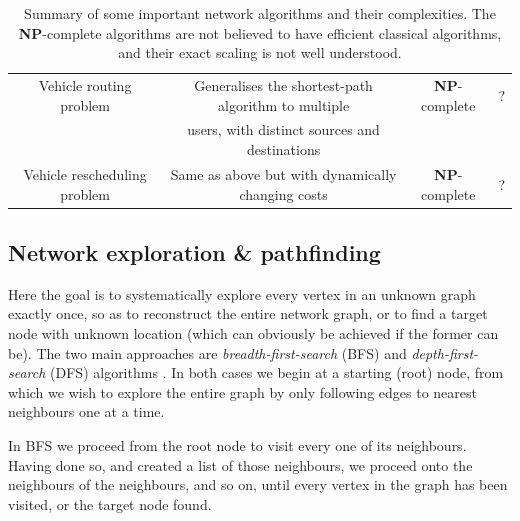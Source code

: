 \begin{table}[!htbp]
\begin{tabular}{|c|c|c|c|}
  		\hline
  		\rowcolor{Lavender} Vehicle routing problem & Generalises the shortest-path algorithm to multiple & \textbf{NP}-complete & ? \\
  		\rowcolor{Lavender} & users, with distinct sources and destinations & & \\ 
  		\hline
  		\rowcolor{Lavender} Vehicle rescheduling problem & Same as above but with dynamically changing costs & \textbf{NP}-complete & ? \\
    	\hline
	\end{tabular}
	\captionspace \caption{Summary of some important network algorithms and their complexities. The \textbf{NP}-complete algorithms are not believed to have efficient classical algorithms, and their exact scaling is not well understood.} \label{tab:net_alg_sum} 
\end{table}
\startalgtable

%
%

\subsection{Network exploration \& pathfinding} \label{sec:path_exp} 

Here the goal is to systematically explore every vertex in an unknown graph exactly once, so as to reconstruct the entire network graph, or to find a target node with unknown location (which can obviously be achieved if the former can be). The two main approaches are \textit{breadth-first-search} (BFS) and \textit{depth-first-search} (DFS) algorithms . In both cases we begin at a starting (root) node, from which we wish to explore the entire graph by only following edges to nearest neighbours one at a time.

In BFS we proceed from the root node to visit every one of its neighbours. Having done so, and created a list of those neighbours, we proceed onto the neighbours of the neighbours, and so on, until every vertex in the graph has been visited, or the target node found.

